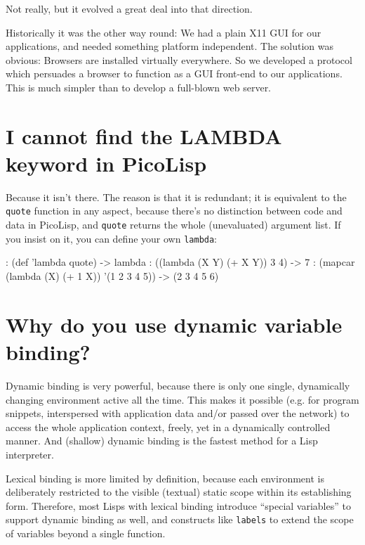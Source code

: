 Not really, but it evolved a great deal into that direction.

Historically it was the other way round: We had a plain X11 GUI for our
applications, and needed something platform independent. The solution
was obvious: Browsers are installed virtually everywhere. So we
developed a protocol which persuades a browser to function as a GUI
front-end to our applications. This is much simpler than to develop a
full-blown web server.

 
\section{I cannot find the LAMBDA keyword in PicoLisp}
\label{sec:faq-i-cannot-find-the-lambda-keyword-in-picolisp}


Because it isn't there. The reason is that it is redundant; it is
equivalent to the \texttt{quote} function in any aspect, because there's no
distinction between code and data in PicoLisp, and \texttt{quote} returns the
whole (unevaluated) argument list. If you insist on it, you can define
your own \texttt{lambda}:


\begin{wideverbatim}
: (def 'lambda quote)
-> lambda
: ((lambda (X Y) (+ X Y)) 3 4)
-> 7
: (mapcar (lambda (X) (+ 1 X)) '(1 2 3 4 5))
-> (2 3 4 5 6)
\end{wideverbatim}

 
\section{Why do you use dynamic variable binding?}
\label{sec:faq-why-do-you-use-dynamic-variable-binding?}


Dynamic binding is very powerful, because there is only one single,
dynamically changing environment active all the time. This makes it
possible (e.g. for program snippets, interspersed with application data
and/or passed over the network) to access the whole application context,
freely, yet in a dynamically controlled manner. And (shallow) dynamic
binding is the fastest method for a Lisp interpreter.

Lexical binding is more limited by definition, because each environment
is deliberately restricted to the visible (textual) static scope within
its establishing form. Therefore, most Lisps with lexical binding
introduce ``special variables'' to support dynamic binding as well, and
constructs like \texttt{labels} to extend the scope of variables beyond a
single function.

